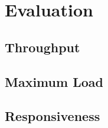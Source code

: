 
\chapter{Evaluation}
\label{ch:Evaluation}

\section{Throughput}

\section{Maximum Load}

\section{Responsiveness}
